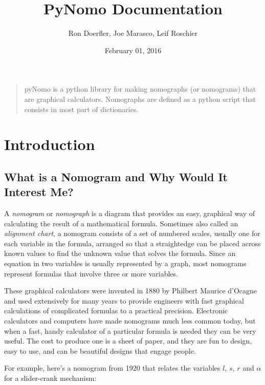 \documentclass[a4paper,11pt,english]{sphinxmanual}
\title{PyNomo Documentation}
\date{February 01, 2016}
\author{Ron Doerfler, Joe Marasco, Leif Roschier}
\begin{document}
\maketitle
\tableofcontents
{}\label{index::doc}

\begin{quote}

pyNomo is a python library for making nomographs (or nomograms) that are graphical calculators.
Nomographs are defined as a python script that consists
in most part of dictionaries.
\end{quote}


\chapter{Introduction}
\label{introduction/introduction:introduction}\label{introduction/introduction::doc}\label{introduction/introduction:pynomo-documentation}

\section{What is a Nomogram and Why Would It Interest Me?}
\label{introduction/introduction:what-is-a-nomogram-and-why-would-it-interest-me}
A \emph{nomogram} or \emph{nomograph} is a diagram that provides an easy, graphical way of calculating the result of a mathematical formula. Sometimes also called an \emph{alignment chart}, a nomogram consists of a set of numbered scales, usually one for each variable in the formula, arranged so that a straightedge can be placed across known values to find the unknown value that solves the formula. Since an equation in two variables is usually represented by a graph, most nomograms represent formulas that involve three or more variables.

These graphical calculators were invented in 1880 by Philbert Maurice d'Ocagne and used extensively for many years to provide engineers with fast graphical calculations of complicated formulas to a practical precision. Electronic calculators and computers have made nomograms much less common today, but when a fast, handy calculator of a particular formula is needed they can be very useful. The cost to produce one is a sheet of paper, and they are fun to design, easy to use, and can be beautiful designs that engage people.

For example, here's a nomogram from 1920 that relates the variables \(l\), \(s\), \(r\) and \(\alpha\) for a slider-crank mechanism:
\end{document}
